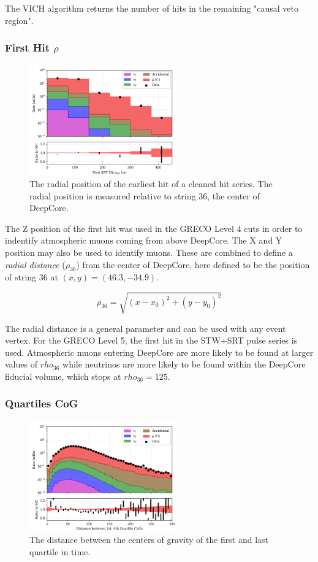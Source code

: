 The VICH algorithm returns the number of hits in the remaining "causal veto region".

\subsubsection{First Hit $\rho$}
\begin{figure}[h]
	\centering
		\includegraphics[width=2.5in]{First_HLC_Rho_log.png}
		\caption[First Hit $\rho$ Position]{The radial position of the earliest hit of a cleaned hit series. The radial position is measured relative to string 36, the center of DeepCore.}
	\label{fig:firsthit_rho}
\end{figure}

The Z position of the first hit was used in the GRECO Level 4 cuts in order to indentify atmospheric muons coming from above DeepCore.
The X and Y position may also be used to identify muons.
These are combined to define a \emph{radial distance} (\emph{$\rho_{36}$}) from the center of DeepCore, here defined to be the position of string 36 at $(x,y)=(46.3, -34.9)$.

\begin{equation}
\rho_{36} = \sqrt{\left(x-x_0\right)^2 + \left(y-y_0\right)^2}
\end{equation}

The radial distance is a general parameter and can be used with any event vertex. 
For the GRECO Level 5, the first hit in the STW+SRT pulse series is used.
Atmospheric muons entering DeepCore are more likely to be found at larger values of $rho_{36}$ while neutrinos are more likely to be found within the DeepCore fiducial volume, which stops at $rho_{36}=125$.

\subsubsection{Quartiles CoG}
\begin{figure}[h]
	\centering
		\includegraphics[width=2.5in]{Q1-Q4_Distance_log.png}
		\caption[Quartile Distance]{The distance between the centers of gravity of the first and last quartile in time.}
	\label{fig:quartile_distance}
\end{figure}


